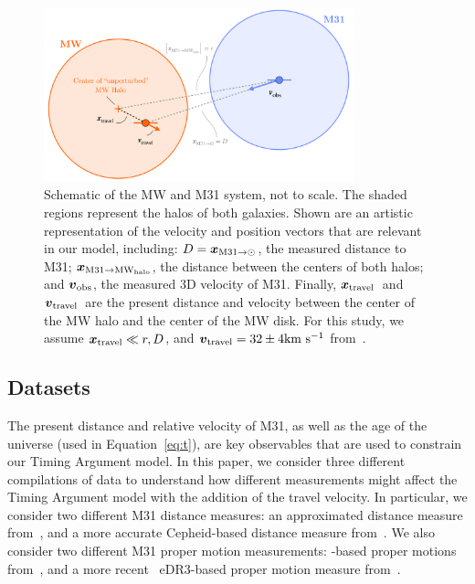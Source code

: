 \documentclass[twocolumn]{aastex631}
\newcommand{\bov}{\ensuremath{\boldsymbol{v}}}
\newcommand{\boldx}{\ensuremath{\boldsymbol{x}}}
\newcommand{\vtrav}{\ensuremath{\bov_{\rm travel}}}
\newcommand{\xtrav}{\ensuremath{\boldx_{\rm travel}}}
\newcommand{\pos}[2]{\ensuremath{\boldx_{\rm #1 \to #2}}}
\newcommand{\mwouter}{\ensuremath{\textrm{MW}_\textrm{halo}}}
\begin{document}
\begin{figure}[htb]
  \centering
  \includegraphics[width=0.8\textwidth]{schematic.pdf}
  \caption{
    Schematic of the MW and M31 system, not to scale. The shaded regions
    represent the halos of both galaxies. Shown are an artistic representation
    of the velocity and position vectors that are relevant in our model,
    including: 
    $D=\pos{M31}{\odot}$, the measured distance to M31;
    $\pos{M31}{\mwouter}$, the distance between the centers of both halos;
    and $\boldsymbol{v}_{\rm obs}$, the measured 3D velocity of M31.
    Finally, \xtrav\ and \vtrav\ are the present distance and velocity 
    between the center of the MW halo and the center of the MW disk.
    For this study, we assume $\xtrav\ll r,D$, and $\vtrav = 32\pm4 \kms$ 
    from~\cite{Petersen2021}.
    }
  \label{fig:schematic}
\end{figure}


\subsection{Datasets}
\label{sec:datasets}
The present distance and relative velocity of M31, as well as the age of the 
universe (used in Equation~\ref{eq:t}), are key observables that are used to 
constrain our Timing Argument model. In this paper, we consider three different compilations of data to understand how different measurements might affect the 
Timing Argument model with the addition of the travel velocity. In particular, 
we consider two different M31 distance measures: an approximated distance 
measure from~\cite{vdm2008}, and a more accurate Cepheid-based distance measure 
from~\cite{Li2021}. We also consider two different M31 proper motion 
measurements: \hst-based proper motions from~\cite{vdm2012}, and a more recent 
\gaia\ eDR3-based proper motion measure from~\cite{Salomon2021}. 
\end{document}
